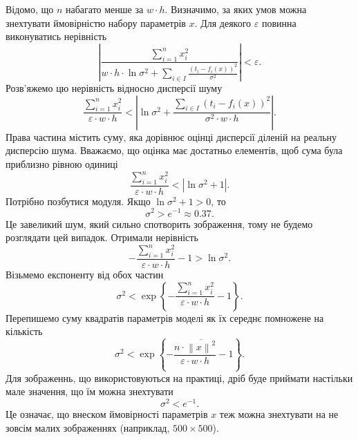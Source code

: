 Відомо, що $n$ набагато менше за $w \cdot h$.
Визначимо, за яких умов можна знехтувати ймовірністю набору параметрів $x$.
Для деякого $\varepsilon$ повинна виконуватись нерівність
\begin{equation*}
  \left|
    \frac{\sum\limits_{i = 1}^n x_i^2}
         {w \cdot h \cdot \ln{\sigma^2}
          + \sum\limits_{i \in I}
            \frac{\left( t_i - f_i\left( x \right) \right)^2}{\sigma^2}}
  \right|
  < \varepsilon.
\end{equation*}
Розв'яжемо цю нерівність відносно дисперсії шуму
\begin{equation*}
  \frac{\sum\limits_{i = 1}^n x_i^2}{\varepsilon \cdot w \cdot h}
  < \left| \ln\sigma^2
    + \frac{\sum\limits_{i \in I} \left( t_i - f_i\left( x \right) \right)^2}
           {\sigma^2 \cdot w \cdot h}
   \right|.
\end{equation*}
Права частина містить суму, яка дорівнює оцінці дисперсії
діленій на реальну дисперсію шума.
Вважаємо, що оцінка має достатньо елементів,
щоб сума була приблизно рівною одиниці
\begin{equation*}
  \frac{\sum\limits_{i = 1}^n x_i^2}{\varepsilon \cdot w \cdot h}
  < \left| \ln\sigma^2 + 1 \right|.
\end{equation*}
Потрібно позбутися модуля.
Якщо $\ln\sigma^2 + 1 > 0$, то
\begin{equation*}
  \sigma^2 > e^{-1} \approx 0.37.
\end{equation*}
Це завеликий шум, який сильно спотворить зображення,
тому не будемо розглядати цей випадок.
Отримали нерівність
\begin{equation*}
  - \frac{\sum\limits_{i = 1}^n x_i^2}{\varepsilon \cdot w \cdot h} - 1
  > \ln\sigma^2.
\end{equation*}
Візьмемо експоненту від обох частин
\begin{equation*}
  \sigma^2
  < \exp{\left\{
      - \frac{\sum\limits_{i = 1}^n x_i^2}
             {\varepsilon \cdot w \cdot h}
      - 1
    \right\}}.
\end{equation*}
Перепишемо суму квадратів параметрів моделі як їх середнє помножене на кількість
\begin{equation*}
  \sigma^2
  < \exp{\left\{
      - \frac{n \cdot \overline{\left\| x \right\|^2}}
             {\varepsilon \cdot w \cdot h}
      - 1
    \right\}}.
\end{equation*}
Для зображеннь,
що використовуються на практиці,
дріб буде приймати настільки мале значення,
що їм можна знехтувати
\begin{equation*}
  \sigma^2 < e^{- 1}.
\end{equation*}
Це означає, що внеском ймовірності параметрів $x$ теж можна знехтувати
на не зовсім малих зображеннях (наприклад, $500 \times 500$).

